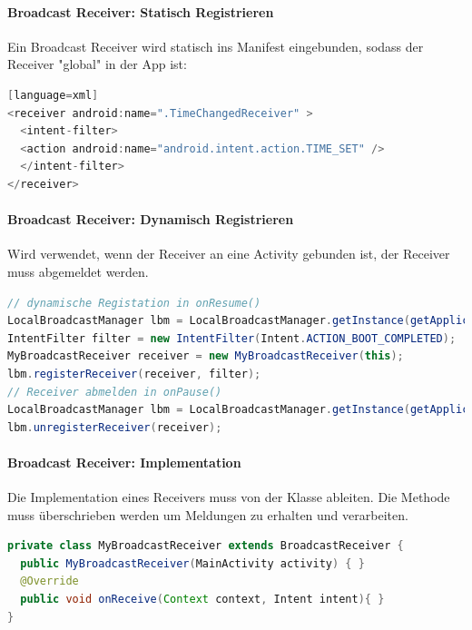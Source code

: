 \paragraph{Broadcast Receiver: Statisch Registrieren}
Ein Broadcast Receiver wird statisch ins Manifest eingebunden, sodass der Receiver "global" in der App ist:
\begin{lstlisting}[language=java][language=xml]
<receiver android:name=".TimeChangedReceiver" >
  <intent-filter>
  <action android:name="android.intent.action.TIME_SET" />
  </intent-filter>
</receiver>
\end{lstlisting}
\paragraph{Broadcast Receiver: Dynamisch Registrieren}
Wird verwendet, wenn der Receiver an eine Activity gebunden ist, der Receiver muss abgemeldet werden.
\begin{lstlisting}[language=java]
// dynamische Registation in onResume()
LocalBroadcastManager lbm = LocalBroadcastManager.getInstance(getApplicationContext());
IntentFilter filter = new IntentFilter(Intent.ACTION_BOOT_COMPLETED);
MyBroadcastReceiver receiver = new MyBroadcastReceiver(this);
lbm.registerReceiver(receiver, filter);
// Receiver abmelden in onPause()
LocalBroadcastManager lbm = LocalBroadcastManager.getInstance(getApplicationContext());
lbm.unregisterReceiver(receiver);
\end{lstlisting}
\paragraph{Broadcast Receiver: Implementation} Die Implementation eines Receivers muss von der Klasse  ableiten. Die Methode  muss überschrieben werden um Meldungen zu erhalten und verarbeiten.
\begin{lstlisting}[language=java]
private class MyBroadcastReceiver extends BroadcastReceiver {
  public MyBroadcastReceiver(MainActivity activity) { }
  @Override
  public void onReceive(Context context, Intent intent){ }
}
\end{lstlisting}

